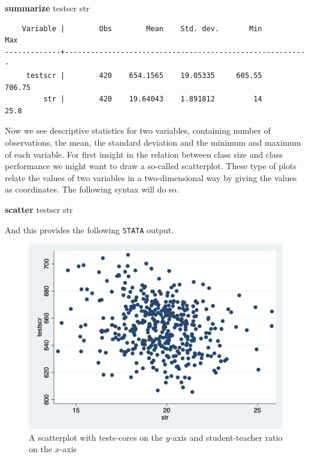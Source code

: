\documentclass[
]{book}
\newenvironment{Shaded}{\begin{snugshade}}{\end{snugshade}}
\newcommand{\KeywordTok}[1]{\textcolor[rgb]{0.13,0.29,0.53}{\textbf{#1}}}
\newcommand{\NormalTok}[1]{#1}
\begin{document}
\begin{Shaded}
\begin{Highlighting}[]
\KeywordTok{summarize}\NormalTok{ testscr str}
\end{Highlighting}
\end{Shaded}

\begin{verbatim}
    Variable |        Obs        Mean    Std. dev.       Min        Max
-------------+---------------------------------------------------------
     testscr |        420    654.1565    19.05335     605.55     706.75
         str |        420    19.64043    1.891812         14       25.8
\end{verbatim}

Now we see descriptive statistics for two variables, containing number of observations, the mean, the standard deviation and the minimum and maximum of each variable. For first insight in the relation between class size and class performance we might want to draw a so-called scatterplot. These type of plots relate the values of two variables in a two-dimensional way by giving the values as coordinates. The following syntax will do so.

\begin{Shaded}
\begin{Highlighting}[]
\KeywordTok{scatter}\NormalTok{ testscr str}
\end{Highlighting}
\end{Shaded}

And this provides the following \texttt{STATA} output.

\begin{figure}
\includegraphics[width=18.33in]{./figures/scatter} \caption{A scatterplot with tests-cores on the $y$-axis and student-teacher ratio on the $x$-axis}\label{fig:scattercaschool}
\end{figure}
\end{document}
